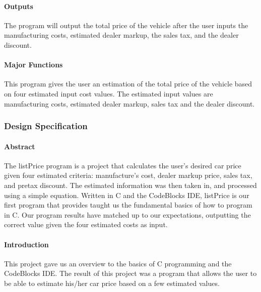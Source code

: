 \documentclass{article}
\begin{document}
		\paragraph{Outputs} The program will output the total price of the vehicle after the user inputs the manufacturing costs, estimated dealer markup, the sales tax, and the dealer discount. 

		\paragraph{Major Functions} This program gives the user an estimation of the total price of the vehicle based on four estimated input cost values. The estimated input values are manufacturing costs, estimated dealer markup, sales tax and the dealer discount. 


	\subsubsection{Design Specification}
		\paragraph{Abstract} The listPrice program is a project that calculates the user’s desired car price given four estimated criteria: manufacture’s cost, dealer markup price, sales tax, and pretax discount. The estimated information was then taken in, and processed using a simple equation. Written in C and the CodeBlocks IDE, listPrice is our first program that provides taught us the fundamental basics of how to program in C. Our program results have matched up to our expectations, outputting the correct value given the four estimated costs as input.

		\paragraph{Introduction} This project gave us an overview to the basics of C programming and the CodeBlocks IDE. The result of this project was a program that allows the user to be able to estimate his/her car price based on a few estimated values. 
\end{document}
